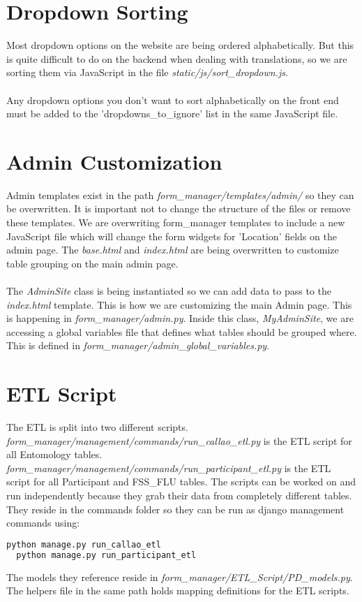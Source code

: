 \documentclass{article}
\begin{document}
\section{Dropdown Sorting}
Most dropdown options on the website are being ordered alphabetically. But this is quite difficult to do on the backend when dealing with translations, so we are sorting them via JavaScript in the file \textit{static/js/sort\_dropdown.js}.
\\\\Any dropdown options you don't want to sort alphabetically on the front end must be added to the 'dropdowns\_to\_ignore' list in the same JavaScript file.

\section{Admin Customization}
Admin templates exist in the path \textit{form\_manager/templates/admin/} so they can be overwritten.  It is important not to change the structure of the files or remove these templates. We are overwriting form\_manager templates to include a new JavaScript file which will change the form widgets for 'Location' fields on the admin page. The \textit{base.html} and \textit{index.html} are being overwritten to customize table grouping on the main admin page.
\\\\
The \textit{AdminSite} class is being instantiated so we can add data to pass to the \textit{index.html} template.  This is how we are customizing the main Admin page. This is happening in \textit{form\_manager/admin.py}. Inside this class, \textit{MyAdminSite}, we are accessing a global variables file that defines what tables should be grouped where. This is defined in \textit{form\_manager/admin\_global\_variables.py}.

\section{ETL Script}
The ETL is split into two different scripts.
\\\textit{form\_manager/management/commands/run\_callao\_etl.py} is the ETL script for all Entomology tables.  \\\textit{form\_manager/management/commands/run\_participant\_etl.py} is the ETL script for all Participant and FSS\_FLU tables. The scripts can be worked on and run independently because they grab their data from completely different tables. They reside in the commands folder so they can be run as django management commands using:
\begin{lstlisting}[language=bash]
  python manage.py run_callao_etl
  python manage.py run_participant_etl
\end{lstlisting}
The models they reference reside in \textit{form\_manager/ETL\_Script/PD\_models.py}.  The helpers file in the same path holds mapping definitions for the ETL scripts.
\end{document}
